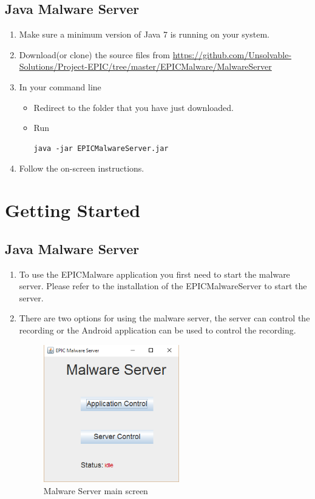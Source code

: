 \documentclass[a4paper,12pt,titlepage]{article}
\begin{document}
\subsection{Java Malware Server}
\begin{enumerate}
\item Make sure a minimum version of Java 7 is running on your system.
\item Download(or clone) the source files from \url{https://github.com/Unsolvable-Solutions/Project-EPIC/tree/master/EPICMalware/MalwareServer}
\item In your command line
\begin{itemize}
\item Redirect to the folder that you have just downloaded.
\item Run
\begin{verbatim}
java -jar EPICMalwareServer.jar
\end{verbatim}

\end{itemize}
\item Follow the on-screen instructions.
\end{enumerate}


\section{Getting Started}


\subsection{Java Malware Server}
\begin{enumerate}
\item To use the EPICMalware application you first need to start the malware server.
Please refer to the installation of the EPICMalwareServer to start the server.
\item There are two options for using the malware server, the server can control the recording or the Android application can be used to control the recording. 
\begin{figure}[H]
\center
\includegraphics[height=6cm]{MalwareScreenshots/AppStart}
\caption{Malware Server main screen}
\label{fig:my_label5}
\end{figure}
\end{enumerate}
\end{document}
